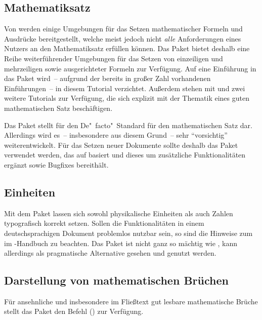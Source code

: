 \documentclass[%
  english,ngerman,%
  cdgeometry=no,DIV=12,automark%
]{tudscrartcl}
\begin{document}
\subsection{Mathematiksatz}
Von  werden einige Umgebungen für das Setzen mathematischer 
Formeln und Ausdrücke bereitgestellt, welche meist jedoch nicht \emph{alle} 
Anforderungen eines Nutzers an den Mathematiksatz erfüllen können. Das Paket
 bietet deshalb eine Reihe weiterführender Umgebungen für das 
Setzen von einzeiligen und mehrzeiligen sowie ausgerichteter Formeln zur 
Verfügung. Auf eine Einführung in das Paket wird~-- aufgrund der bereits in 
großer Zahl vorhandenen Einführungen~-- in diesem Tutorial verzichtet. Außerdem 
stehen mit  und  zwei weitere Tutorials 
zur Verfügung, die sich explizit mit der Thematik eines guten mathematischen 
Satz beschäftigen.

Das Paket  stellt für  den De"~facto"~Standard 
für den mathematischen Satz dar. Allerdings wird es~-- insbesondere aus diesem 
Grund~-- sehr \enquote{vorsichtig} weiterentwickelt. Für das Setzen neuer 
Dokumente sollte deshalb das Paket  verwendet werden, das
auf  basiert und dieses um zusätzliche Funktionalitäten 
ergänzt sowie Bugfixes bereithält.


\subsection{Einheiten}
Mit dem Paket  lassen sich sowohl physikalische Einheiten als 
auch Zahlen typografisch korrekt setzen. Sollen die Funktionalitäten in einem 
deutschsprachigen Dokument problemlos nutzbar sein, so sind die Hinweise zum 
 im 
\TUDScript-Handbuch zu beachten. Das Paket  ist nicht ganz so 
mächtig wie , kann allerdings als pragmatische Alternative 
gesehen und genutzt werden.


\subsection{Darstellung von mathematischen Brüchen}
Für ansehnliche und insbesondere im Fließtext gut lesbare mathematische Brüche 
stellt das Paket  den Befehl () zur 
Verfügung.
%
\begin{Preamble}
\usepackage{xfrac}

\end{Preamble}
\end{document}
